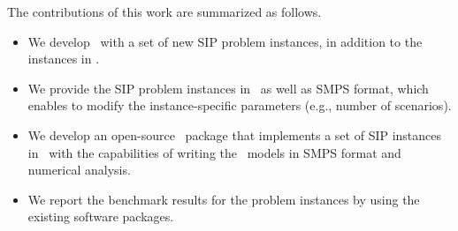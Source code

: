 
The contributions of this work are summarized as follows.
\begin{itemize}
	\item We develop \siplibtwo\ with a set of new SIP problem instances, in addition to the instances in \siplib.
	\item We provide the SIP problem instances in \julia\, as well as SMPS format, which enables to modify the instance-specific parameters (e.g., number of scenarios).
	\item We develop an open-source \julia\ package that implements a set of SIP instances in \julia\ with the capabilities of writing the \julia\ models in SMPS format and numerical analysis.
	\item We report the benchmark results for the problem instances by using the existing software packages.
\end{itemize}


